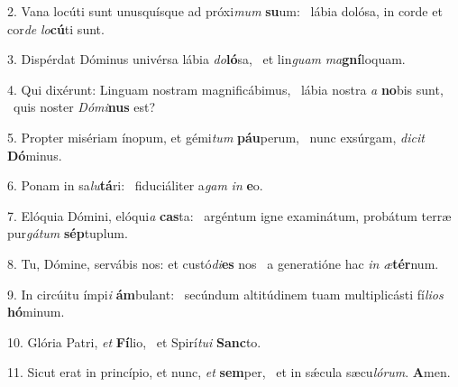 2. Vana locúti sunt unusquísque ad próxi\textit{mum} \textbf{su}um: \ast\  lábia dolósa, in corde et cor\textit{de} \textit{lo}\textbf{cú}ti sunt.\

3. Dispérdat Dóminus univérsa lábia \textit{do}\textbf{ló}sa, \ast\  et lin\textit{guam} \textit{ma}\textbf{gní}loquam.\

4. Qui dixérunt: Linguam nostram magnificábimus, \dag\  lábia nostra \textit{a} \textbf{no}bis sunt, \ast\  quis noster \textit{Dó}\textit{mi}\textbf{nus} est?\

5. Propter misériam ínopum, et gémi\textit{tum} \textbf{páu}perum, \ast\  nunc exsúrgam, \textit{di}\textit{cit} \textbf{Dó}minus.\

6. Ponam in sa\textit{lu}\textbf{tá}ri: \ast\  fiduciáliter a\textit{gam} \textit{in} \textbf{e}o.\

7. Elóquia Dómini, elóqui\textit{a} \textbf{cas}ta: \ast\  argéntum igne examinátum, probátum terræ pur\textit{gá}\textit{tum} \textbf{sép}tuplum.\

8. Tu, Dómine, servábis nos: et custó\textit{di}\textbf{es} nos \ast\  a generatióne hac \textit{in} \textit{æ}\textbf{tér}num.\

9. In circúitu ímpi\textit{i} \textbf{ám}bulant: \ast\  secúndum altitúdinem tuam multiplicásti fí\textit{li}\textit{os} \textbf{hó}minum.\

10. Glória Patri, \textit{et} \textbf{Fí}lio, \ast\  et Spirí\textit{tu}\textit{i} \textbf{Sanc}to.\

11. Sicut erat in princípio, et nunc, \textit{et} \textbf{sem}per, \ast\  et in sǽcula sæcu\textit{ló}\textit{rum}. \textbf{A}men.\

